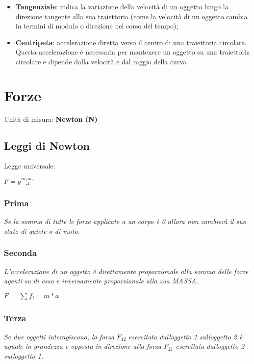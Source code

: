 \begin{itemize}
\item
  \textbf{Tangenziale}: indica la variazione della velocità di un
  oggetto lungo la direzione tangente alla sua traiettoria (come la
  velocità di un oggetto cambia in termini di modulo o direzione nel
  corso del tempo);
\item
  \textbf{Centripeta}: accelerazione diretta verso il centro di una
  traiettoria circolare. Questa accelerazione è necessaria per mantenere
  un oggetto su una traiettoria circolare e dipende dalla velocità e dal
  raggio della curva
\end{itemize}

\section{Forze}\label{forze}

Unità di misura: \textbf{Newton (N)}

\subsection{Leggi di Newton}\label{leggi-di-newton}

Legge universale:

\(F = g\frac{m_{1}m_{2}}{r^{2}}\)

\subsubsection{Prima}\label{prima}

\emph{Se la somma di tutte le forze applicate a un corpo è 0 allora non
cambierà il suo stato di quiete o di moto.}

\subsubsection{Seconda}\label{seconda}

\emph{L'accelerazione di un oggetto è direttamente proporzionale alla
somma delle forze agenti su di esso e inversamente proporzionale alla
sua MASSA.}

\(F\  = \sum_{}^{}f_{i} = m*a\)

\subsubsection{Terza}\label{terza}

\emph{Se due oggetti interagiscono, la forza} \(F_{12}\)
\emph{esercitata dall\textquotesingle oggetto 1
sull\textquotesingle oggetto 2 è uguale in grandezza e opposta in
direzione alla forza} \(F_{21}\) \emph{esercitata
dall\textquotesingle oggetto 2 sull\textquotesingle oggetto 1.}


